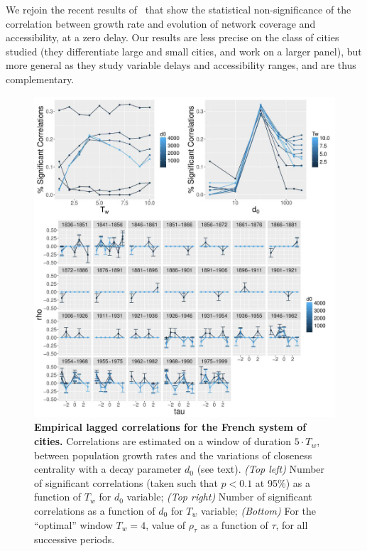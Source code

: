 \documentclass[11pt]{article}
\begin{document}
We rejoin the recent results of~\cite{mimeur:hal-01616746} that show the statistical non-significance of the correlation between growth rate and evolution of network coverage and accessibility, at a zero delay. Our results are less precise on the class of cities studied (they differentiate large and small cities, and work on a larger panel), but more general as they study variable delays and accessibility ranges, and are thus complementary.


\begin{figure}
	\includegraphics[width=\linewidth]{6-2-3-fig-macrocoevol-empirical.jpg}
	\caption[Empirical lagged correlations for the French system of cities]{\textbf{Empirical lagged correlations for the French system of cities.} Correlations are estimated on a window of duration $5\cdot T_w$, between population growth rates and the variations of closeness centrality with a decay parameter $d_0$ (see text). \textit{(Top left)} Number of significant correlations (taken such that $p<0.1$ at 95\%) as a function of $T_w$ for $d_0$ variable; \textit{(Top right)} Number of significant correlations as a function of $d_0$ for $T_w$ variable; \textit{(Bottom)} For the ``optimal'' window $T_w = 4$, value of $\rho_{\tau}$ as a function of $\tau$, for all successive periods.\label{fig:macrocoevol:empirical}}
\end{figure}
\end{document}
